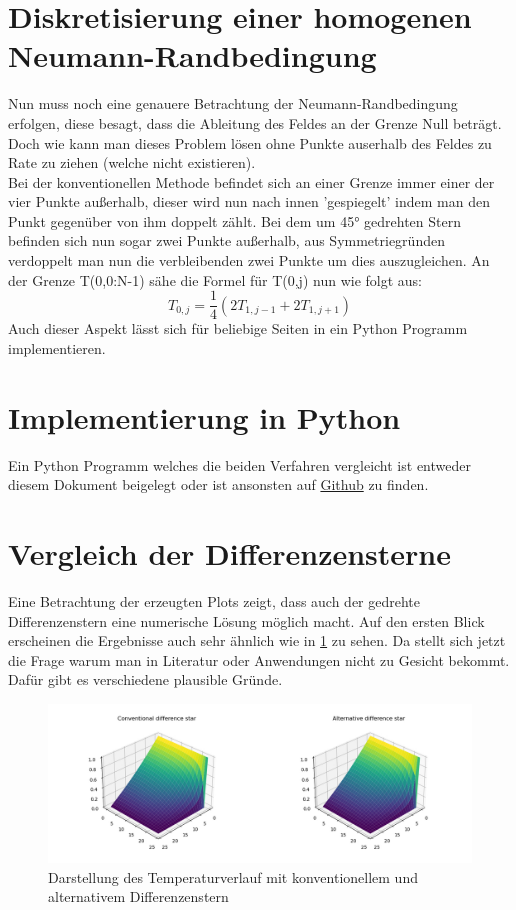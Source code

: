 \documentclass[twoside,10pt,a4paper]{article}
\numberwithin{equation}{section}					%
\numberwithin{figure}{section}						%
\begin{document}
\section{Diskretisierung einer homogenen Neumann-Randbedingung}
Nun muss noch eine genauere Betrachtung der Neumann-Randbedingung erfolgen, diese besagt, dass die Ableitung des Feldes an der Grenze Null beträgt. Doch wie kann man dieses Problem lösen ohne Punkte auserhalb des Feldes zu Rate zu ziehen (welche nicht existieren).\\
Bei der konventionellen Methode befindet sich an einer Grenze immer einer der vier Punkte außerhalb, dieser wird nun nach innen 'gespiegelt' indem man den Punkt gegenüber von ihm doppelt zählt.
Bei dem um 45° gedrehten Stern befinden sich nun sogar zwei Punkte außerhalb, aus Symmetriegründen verdoppelt man nun die verbleibenden zwei Punkte um dies auszugleichen.
An der Grenze T(0,0:N-1) sähe die Formel für T(0,j) nun wie folgt aus:\\
\begin{equation}
    T_{0,j}=\frac{1}{4}(2T_{1,j-1}+2T_{1,j+1})
\end{equation}
Auch dieser Aspekt lässt sich für beliebige Seiten in ein Python Programm implementieren.

\section{Implementierung in Python}
Ein Python Programm welches die beiden Verfahren vergleicht ist entweder diesem Dokument beigelegt oder ist ansonsten auf \href{https://github.com/FReinwald/Heat-transfer-with-alternative-difference-star}{Github} zu finden.

\section{Vergleich der Differenzensterne}
Eine Betrachtung der erzeugten Plots zeigt, dass auch der gedrehte Differenzenstern eine numerische Lösung möglich macht. Auf den ersten Blick erscheinen die Ergebnisse auch sehr ähnlich wie in \ref{fig:compare} zu sehen. Da stellt sich jetzt die Frage warum man in Literatur oder Anwendungen nicht zu Gesicht bekommt. Dafür gibt es verschiedene plausible Gründe.
\begin{figure}[h]
        \centering
        \includegraphics[width=\textwidth]{bilder/convalt.jpg}
        \caption{Darstellung des Temperaturverlauf mit konventionellem und alternativem Differenzenstern}
        \label{fig:compare}
    \end{figure}
\end{document}
